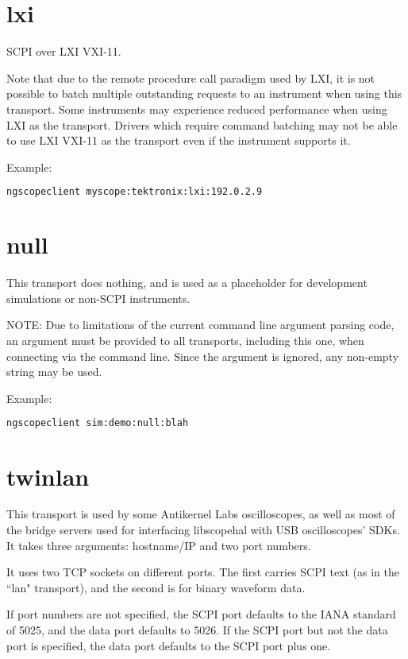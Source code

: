 \section{lxi}

SCPI over LXI VXI-11.

Note that due to the remote procedure call paradigm used by LXI, it is not possible to batch multiple outstanding
requests to an instrument when using this transport. Some instruments may experience reduced performance when using LXI
as the transport. Drivers which require command batching may not be able to use LXI VXI-11 as the transport even if the
instrument supports it.

Example:
\begin{lstlisting}[language=sh, numbers=none]
ngscopeclient myscope:tektronix:lxi:192.0.2.9
\end{lstlisting}

\section{null}

This transport does nothing, and is used as a placeholder for development simulations or non-SCPI instruments.

NOTE: Due to limitations of the current command line argument parsing code, an argument must be provided to all
transports, including this one, when connecting via the command line. Since the argument is ignored, any non-empty
string may be used.

Example:
\begin{lstlisting}[language=sh, numbers=none]
ngscopeclient sim:demo:null:blah
\end{lstlisting}

\section{twinlan}

This transport is used by some Antikernel Labs oscilloscopes, as well as most of the bridge servers used for interfacing
libscopehal with USB oscilloscopes' SDKs. It takes three arguments: hostname/IP and two port numbers.

It uses two TCP sockets on different ports. The first carries SCPI text (as in the ``lan" transport), and the second is
for binary waveform data.

If port numbers are not specified, the SCPI port defaults to the IANA standard of 5025, and the data port defaults to
5026. If the SCPI port but not the data port is specified, the data port defaults to the SCPI port plus one.

